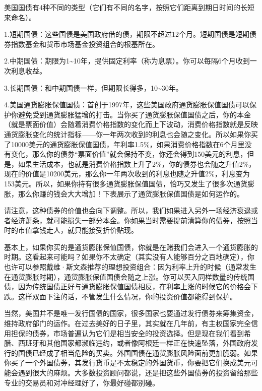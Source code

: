 美国国债有4种不同的类型（它们有不同的名字，按照它们距离到期日时间的长短来命名）。

1.短期国债：这些国债是美国政府借的债，期限不超过12个月。短期国债是短期债券指数基金和货币市场基金投资组合的根基所在。

2.中期国债：期限为1\textasciitilde{}10年，提供固定利率（称为息票）。你可以每隔6个月收到一次利息收益。

3.长期国债：和中期国债一样，但期限长得多，10\textasciitilde{}30年。

4.美国通货膨胀保值国债：首创于1997年，这些美国政府通货膨胀保值国债可以保护你避免受到通货膨胀猛增的打击。当你买了通货膨胀保值国债之后，你的本金（就是票面价值）会随着消费价格指数的变化而上下波动，消费价格指数就是反映通货膨胀变化的统计指标——你一年两次收到的利息也会随之变化。所以如果你买了10000美元的通货膨胀保值国债，年利率1.5\%，如果消费价格指数在6个月里没有变化，那么你的债券“票面价值”就会保持不变，你还会得到150美元的利息，但是，如果生活成本，也就是消费价格指数上升了2\%，你的债券也会随之升值2\%，现在的价值是10200美元，那么你一年两次收到的利息也随之升值2\%，利息变为153美元。所以，如果你持有很多通货膨胀保值国债，恰巧又发生了很多次通货膨胀，那么你赚的钱会大大增加！下表展示了通货膨胀保值国债是如何运作的。



请注意，这种债券的价值也会向下调整。所以，我们如果进入另外一场经济衰退或者经济萧条，就可能损失一部分本金。你如果当时需要提前清算你的债券，按照当时的市值拿钱走人，就只能接受折价贴现。

基本上，如果你买的是通货膨胀保值国债，你就是在赌我们会进入一个通货膨胀的时期。这看起来可能吗？如果你不太确定（其实没有人能够百分之百地确定），你也许可以参照戴维·斯文森推荐的理想投资组合：因为利率上升的时候（通常发生在通货膨胀时期），通货膨胀保值国债会随之上涨。你可以买入同样数量的传统国债，因为传统国债正好与通货膨胀保值国债相反，在利率上涨的时候它的价格会下跌。这样双面下注的话，不管发生什么情况，你的投资价值都能得到保护。

当然，美国并不是唯一发行国债的国家，很多国家也要通过发行债券来筹集资金，维持政府部门的运作。在过去美好的日子里，其实就在几年前，有主权国家完全信用担保的债券，市场普遍认为它们是相当安全的投资选择。但是现在我们看到希腊、西班牙和其他国家都濒临违约，或者像阿根廷一样正在快速坠落，外国政府发行的国债已经成了相当危险的买卖。外国国债在通货膨胀风险面前更加脆弱。如果你买了一个外国债券，其发行货币是不太稳定的外国货币，你要把它们换成美元可能会遇到很大的麻烦。大多数投资顾问都说，还是把这些外国债券的投资留给那些专业的交易员和对冲经理好了，你最好碰都别碰。

